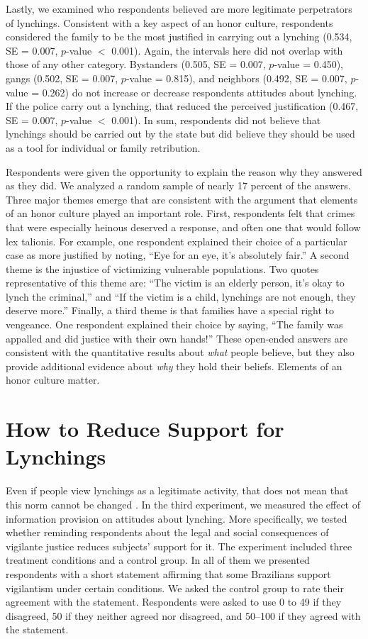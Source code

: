 \documentclass[12pt,ansiapaper]{article}
\begin{document}
Lastly, we examined who respondents believed are more legitimate perpetrators of lynchings. Consistent with a key aspect of an honor culture, respondents considered the family to be the most justified in carrying out a lynching (0.534, SE = 0.007, $p$-value $<$ 0.001). Again, the intervals here did not overlap with those of any other category. Bystanders (0.505, SE = 0.007, $p$-value = 0.450), gangs (0.502, SE = 0.007, $p$-value = 0.815), and neighbors (0.492, SE = 0.007, $p$-value = 0.262) do not increase or decrease respondents attitudes about lynching. If the police carry out a lynching, that reduced the perceived justification (0.467, SE = 0.007, $p$-value $<$ 0.001). In sum, respondents did not believe that lynchings should be carried out by the state but did believe they should be used as a tool for individual or family retribution.

Respondents were given the opportunity to explain the reason why they answered as they did. We analyzed a random sample of nearly 17 percent of the answers. Three major themes emerge that are consistent with the argument that elements of an honor culture played an important role. First, respondents felt that crimes that were especially heinous deserved a response, and often one that would follow lex talionis. For example, one respondent explained their choice of a particular case as more justified by noting, ``Eye for an eye, it's absolutely fair.'' A second  theme is the injustice of victimizing vulnerable populations. Two quotes representative of this theme are: ``The victim is an elderly person, it's okay to lynch the criminal,'' and ``If the victim is a child, lynchings are not enough, they deserve more.'' Finally, a third theme is that families have a special right to vengeance. One respondent explained their choice by saying, ``The family was appalled and did justice with their own hands!'' These open-ended answers are consistent with the quantitative results about \textit{what} people believe, but they also provide additional evidence about \textit{why} they hold their beliefs. Elements of an honor culture matter. 

\section{How to Reduce Support for Lynchings}
\label{sec:exp03}

Even if people view lynchings as a legitimate activity, that does not mean that this norm cannot be changed \citep{weaver2019judge}. In the third experiment, we measured the effect of information provision on attitudes about lynching. More specifically, we tested whether reminding respondents about the legal and social consequences of vigilante justice reduces subjects' support for it. The experiment included three treatment conditions and a control group. In all of them we presented respondents with a short statement affirming that some Brazilians support vigilantism under certain conditions. We asked the control group to rate their agreement with the statement. Respondents were asked to use 0 to 49 if they disagreed, 50 if they neither agreed nor disagreed, and 50--100 if they agreed with the statement.
\end{document}
